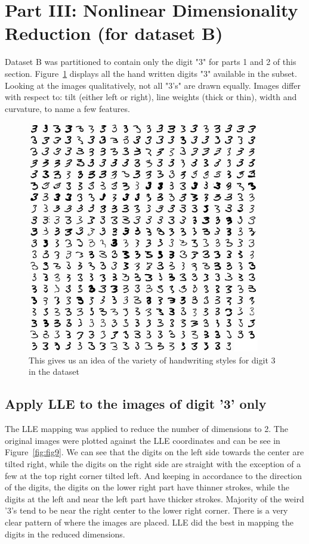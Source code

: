 \section{Part III: Nonlinear Dimensionality Reduction (for dataset B)}

Dataset B was partitioned to contain only the digit "3" for parts 1 and 2 of this section. Figure~\ref{fig:fig8} displays all the hand written digits "3" available in the subset. Looking at the images qualitatively, not all "3's" are drawn equally. Images differ with respect to: tilt (either left or right), line weights (thick or thin), width and curvature, to name a few features. 
\begin{figure}[htb]
 \centering
\includegraphics[width=4in]{assignment1/3-0-alldigit3.png}
\caption{\label{fig:fig8}This gives us an idea of the variety of handwriting styles for digit 3 in the dataset}
\end{figure}


\clearpage{}
\subsection{Apply LLE to the images of digit '3' only}
The LLE mapping was applied to reduce the number of dimensions to 2. The original images were plotted against the LLE coordinates and can be see in Figure~\ref{fig:fig9}. We can see that the digits on the left side towards the center are tilted right, while the digits on the right side are straight with the exception of a few at the top right corner tilted left. And keeping in accordance to the direction of the digits, the digits on the lower right part  have thinner strokes, while the digits at the left and  near the left part have thicker strokes. Majority of the weird '3's tend to be near the right center to the lower right  corner. There is a very clear pattern of where the images are placed. LLE did the best in mapping the digits in the reduced dimensions. 


